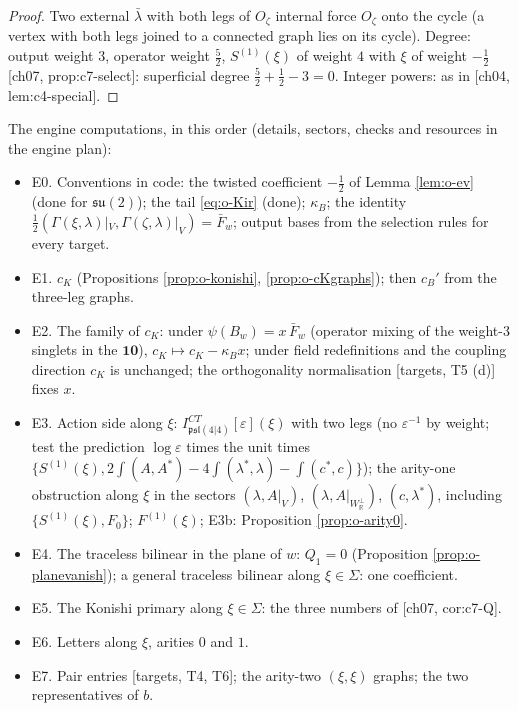 \begin{proof}
Two external $\bar\lambda$ with both legs of $O_\zeta$ internal force $O_\zeta$ onto the cycle (a vertex with both legs joined to a connected graph lies on its cycle). Degree: output weight $3$, operator weight $\tfrac52$, $S^{(1)}(\xi)$ of weight $4$ with $\xi$ of weight $-\tfrac12$ [ch07, prop:c7-select]: superficial degree $\tfrac52+\tfrac12-3=0$. Integer powers: as in [ch04, lem:c4-special].
\end{proof}

The engine computations, in this order (details, sectors, checks and resources in the engine plan):
\begin{itemize}
\item E0. Conventions in code: the twisted coefficient $-\tfrac12$ of Lemma \ref{lem:o-ev} (done for $\mathfrak{su}(2)$); the tail \eqref{eq:o-Kir} (done); $\kappa_B$; the identity $\tfrac12(\Gamma(\xi,\lambda)|_V,\Gamma(\zeta,\lambda)|_V)=\bar F_w$; output bases from the selection rules for every target.
\item E1. $c_K$ (Propositions \ref{prop:o-konishi}, \ref{prop:o-cKgraphs}); then $c_B'$ from the three-leg graphs.
\item E2. The family of $c_K$: under $\psi(B_w)=x\,\bar F_w$ (operator mixing of the weight-$3$ singlets in the $\mathbf{10}$), $c_K\mapsto c_K-\kappa_Bx$; under field redefinitions and the coupling direction $c_K$ is unchanged; the orthogonality normalisation [targets, T5 (d)] fixes $x$.
\item E3. Action side along $\xi$: $I^{CT}_{\mathfrak{psl}(4|4)}[\varepsilon](\xi)$ with two legs (no $\varepsilon^{-1}$ by weight; test the prediction $\log\varepsilon$ times the unit times $\{S^{(1)}(\xi),2\int(A,A^*)-4\int(\lambda^*,\lambda)-\int(c^*,c)\}$); the arity-one obstruction along $\xi$ in the sectors $(\lambda,A|_V)$, $(\lambda,A|_{W_{\mathbb R}^\perp})$, $(c,\lambda^*)$, including $\{S^{(1)}(\xi),F_0\}$; $F^{(1)}(\xi)$; E3b: Proposition \ref{prop:o-arity0}.
\item E4. The traceless bilinear in the plane of $w$: $Q_1=0$ (Proposition \ref{prop:o-planevanish}); a general traceless bilinear along $\xi\in\Sigma$: one coefficient.
\item E5. The Konishi primary along $\xi\in\Sigma$: the three numbers of [ch07, cor:c7-Q].
\item E6. Letters along $\xi$, arities $0$ and $1$.
\item E7. Pair entries [targets, T4, T6]; the arity-two $(\xi,\xi)$ graphs; the two representatives of $b$.

\end{itemize}
